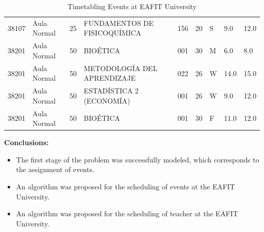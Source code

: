 \documentclass[centering]{report}
\newenvironment{slide}
    {\newpage
    \vspace*{\fill}
    }
    { 
     \vspace*{\fill}
    }
\begin{document}
\begin{slide}
\begin{table}[h!]
{\begin{tabular}{| l | l | l | l | l | l | l | l | l |}
    \color{black}38107 & \color{black}Aula Normal & \color{black}25 & \color{black}FUNDAMENTOS DE FISICOQUÍMICA & \color{black}156 & \color{black}20 & \color{black}S  & \color{black}9.0 & \color{black}12.0 \\
    \color{black}38201 & \color{black}Aula Normal & \color{black}50 & \color{black}BIOÉTICA & \color{black}001 & \color{black}30 & \color{black}M  & \color{black}6.0 & \color{black}8.0 \\
    \color{black}38201 & \color{black}Aula Normal & \color{black}50 & \color{black}METODOLOGÍA DEL APRENDIZAJE & \color{black}022 & \color{black}26 & \color{black}W  & \color{black}14.0 & \color{black}15.0 \\
    \color{black}38201 & \color{black}Aula Normal & \color{black}50 & \color{black}ESTADÍSTICA 2 (ECONOMÍA) & \color{black}001 & \color{black}26 & \color{black}W  & \color{black}9.0 & \color{black}12.0 \\
    \color{black}38201 & \color{black}Aula Normal & \color{black}50 & \color{black}BIOÉTICA & \color{black}001 & \color{black}30 & \color{black}F  & \color{black}11.0 & \color{black}12.0 \\


    \hline
  \end{tabular}%
  }
  \label{Table:result}
  \caption{Timetabling Events at EAFIT University}
\end{table}
\end{slide}

\begin{slide}
\textbf{Conclusions:}\\

\begin{itemize}
\item The first stage of the problem was successfully modeled, which corresponds to the assignment of events.
\item An algorithm was proposed for the scheduling of events
at the EAFIT University.
\item An algorithm was proposed for the scheduling of teacher
at the EAFIT University.
\end{itemize}
\end{slide}


\end{document}
